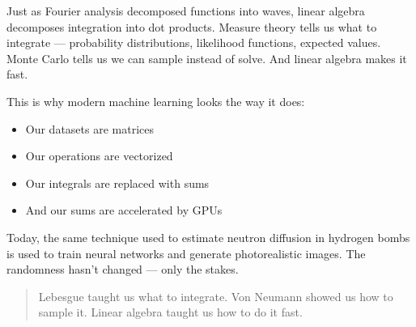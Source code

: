 Just as Fourier analysis decomposed functions into waves, linear algebra decomposes integration into dot products. Measure theory tells us what to integrate — probability distributions, likelihood functions, expected values. Monte Carlo tells us we can sample instead of solve. And linear algebra makes it fast.

This is why modern machine learning looks the way it does:
\begin{itemize}
  \item Our datasets are matrices
  \item Our operations are vectorized
  \item Our integrals are replaced with sums
  \item And our sums are accelerated by GPUs
\end{itemize}

Today, the same technique used to estimate neutron diffusion in hydrogen bombs is used to train neural networks and generate photorealistic images. The randomness hasn’t changed — only the stakes.

\begin{quote}
Lebesgue taught us what to integrate.  
Von Neumann showed us how to sample it.  
Linear algebra taught us how to do it fast.
\end{quote}
